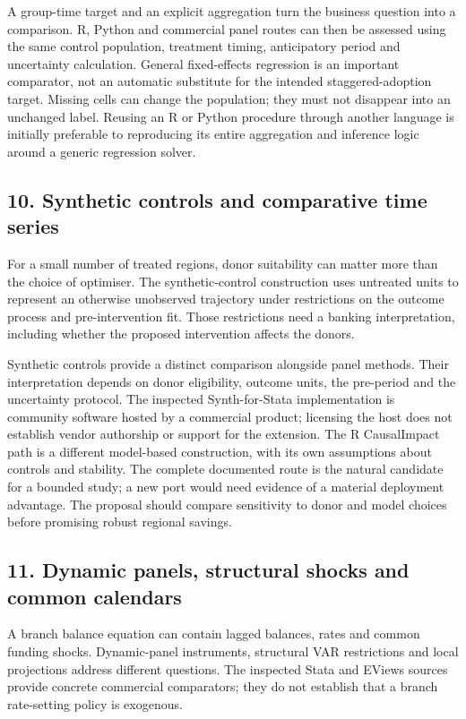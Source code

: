 A group-time target and an explicit aggregation turn the business question
into a comparison. R, Python and commercial panel routes can then be assessed
using the same control population, treatment timing, anticipatory period and
uncertainty calculation. General fixed-effects
regression is an important comparator, not an automatic substitute for the
intended staggered-adoption target.
\citep{exec20_fixest_source,exec24_panelpy_differences,exec18_gp_stata_xthdid}
Missing cells can change the population; they must not disappear into an
unchanged label. Reusing an R or Python procedure through another language is
initially preferable to reproducing its entire aggregation and inference
logic around a generic regression solver.

\subsection{10. Synthetic controls and comparative time series}
For a small number of treated regions, donor suitability can matter more than
the choice of optimiser. The synthetic-control construction uses untreated
units to represent an otherwise unobserved trajectory under restrictions on
the outcome process and pre-intervention fit. Those restrictions need a
banking interpretation, including whether the proposed intervention affects
the donors.
\citep{abadie2010}

Synthetic controls provide a distinct comparison alongside panel methods.
Their interpretation depends on donor eligibility, outcome units, the
pre-period and the uncertainty protocol. The inspected Synth-for-Stata implementation is community
software hosted by a commercial product; licensing the host does not establish
vendor authorship or support for the extension. The R CausalImpact path is a
different model-based construction, with its own assumptions about controls
and stability.
\citep{exec19_synth_stata_source,exec13_ci_r,exec13_ci_semantics}
The complete documented route is the natural candidate for a bounded study;
a new port would need evidence of a material deployment advantage. The proposal should
compare sensitivity to donor and model choices before promising robust regional
savings.

\subsection{11. Dynamic panels, structural shocks and common calendars}
A branch balance equation can contain lagged balances, rates and common funding
shocks. Dynamic-panel instruments, structural VAR restrictions and local
projections address different questions. The inspected Stata and EViews sources
provide concrete commercial comparators; they do not establish that a branch
rate-setting policy is exogenous.
\citep{exec19_dynamic_stata_ab,exec19_dynamic_stata_system,
exec19_dynamic_stata_lp,exec19_dynamic_eviews_panel}

